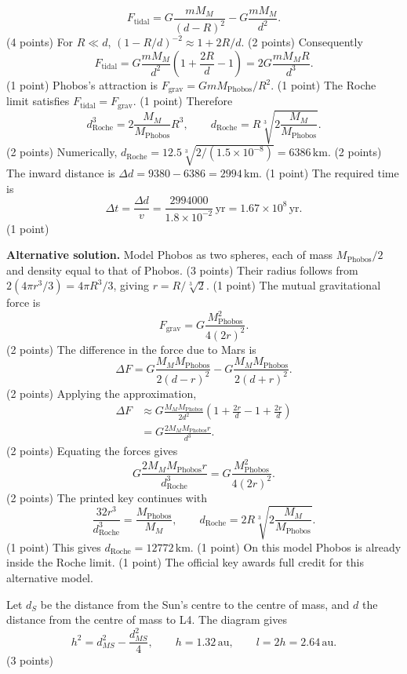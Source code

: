 \begin{description}
\[
F_{\mathrm{tidal}}=G\frac{mM_M}{(d-R)^2}-G\frac{mM_M}{d^2}.
\]\hfill(4 points)
For $R\ll d$, $(1-R/d)^{-2}\approx1+2R/d$. \hfill(2 points)
Consequently
\[
F_{\mathrm{tidal}}=G\frac{mM_M}{d^2}\left(1+\frac{2R}{d}-1\right)
=2G\frac{mM_MR}{d^3}.
\]\hfill(1 point)
Phobos's attraction is $F_{\mathrm{grav}}=GmM_{\mathrm{Phobos}}/R^2$. \hfill(1 point)
The Roche limit satisfies $F_{\mathrm{tidal}}=F_{\mathrm{grav}}$. \hfill(1 point)
Therefore
\[
d_{\mathrm{Roche}}^3=2\frac{M_M}{M_{\mathrm{Phobos}}}R^3,\qquad
d_{\mathrm{Roche}}=R\sqrt[3]{2\frac{M_M}{M_{\mathrm{Phobos}}}}.
\]\hfill(2 points)
Numerically, $d_{\mathrm{Roche}}=12.5\sqrt[3]{2/(1.5\times10^{-8})}=6386\,\mathrm{km}$. \hfill(2 points)
The inward distance is $\Delta d=9380-6386=2994\,\mathrm{km}$. \hfill(1 point)
The required time is
\[
\Delta t=\frac{\Delta d}{v}=\frac{2994000}{1.8\times10^{-2}}\,\mathrm{yr}=1.67\times10^8\,\mathrm{yr}.
\]\hfill(1 point)

\textbf{Alternative solution.} Model Phobos as two spheres, each of mass $M_{\mathrm{Phobos}}/2$ and density equal to that of Phobos. \hfill(3 points)
Their radius follows from $2(4\pi r^3/3)=4\pi R^3/3$, giving $r=R/\sqrt[3]2$. \hfill(1 point)
The mutual gravitational force is
\[
F_{\mathrm{grav}}=G\frac{M_{\mathrm{Phobos}}^2}{4(2r)^2}.
\]\hfill(2 points)
The difference in the force due to Mars is
\[
\Delta F=G\frac{M_MM_{\mathrm{Phobos}}}{2(d-r)^2}-G\frac{M_MM_{\mathrm{Phobos}}}{2(d+r)^2}.
\]\hfill(2 points)
Applying the approximation,
\begin{align*}
\Delta F&\approx G\frac{M_MM_{\mathrm{Phobos}}}{2d^2}
\left(1+\frac{2r}{d}-1+\frac{2r}{d}\right)\\
&=G\frac{2M_MM_{\mathrm{Phobos}}r}{d^3}.
\end{align*}\hfill(2 points)
Equating the forces gives
\[
G\frac{2M_MM_{\mathrm{Phobos}}r}{d_{\mathrm{Roche}}^3}=G\frac{M_{\mathrm{Phobos}}^2}{4(2r)^2}.
\]\hfill(2 points)
The printed key continues with
\[
\frac{32r^3}{d_{\mathrm{Roche}}^3}=\frac{M_{\mathrm{Phobos}}}{M_M},\qquad
d_{\mathrm{Roche}}=2R\sqrt[3]{2\frac{M_M}{M_{\mathrm{Phobos}}}}.
\]\hfill(1 point)
This gives $d_{\mathrm{Roche}}=12772\,\mathrm{km}$. \hfill(1 point)
On this model Phobos is already inside the Roche limit. \hfill(1 point)
The official key awards full credit for this alternative model.
\item[(d)] Let $d_S$ be the distance from the Sun's centre to the centre of mass, and $d$ the distance from the centre of mass to L4.
The diagram gives
\[
h^2=d_{MS}^2-\frac{d_{MS}^2}{4},\qquad h=1.32\,\mathrm{au},\qquad l=2h=2.64\,\mathrm{au}.
\]\hfill(3 points)
\end{description}
